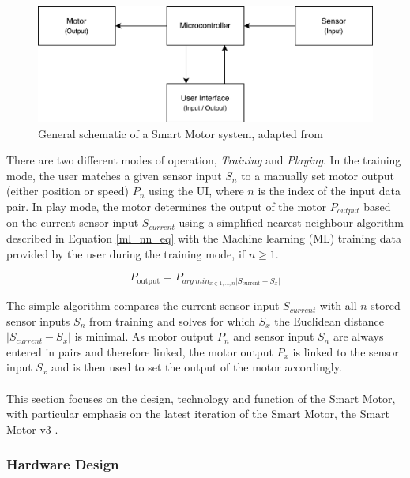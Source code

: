 \begin{figure}[H]
    \centering
    \includegraphics[width=0.75\linewidth]{overleaf/images/sm_concept.png}
    \vspace{\ftspace}
    \caption{General schematic of a Smart Motor system, adapted from \citet[p. 19]{dahal_designing_2024}}
    \label{fig:sm_schematic}
\end{figure}

There are two different modes of operation, \textit{Training} and \textit{Playing}. In the training mode, the user matches a given sensor input $S_n$ to a manually set motor output (either position or speed) $P_n$ using the UI, where $n$ is the index of the input data pair.
In play mode, the motor determines the output of the motor $P_{output}$ based on the current sensor input $S_{current}$ using a simplified nearest-neighbour algorithm described in Equation \ref{ml_nn_eq} with the Machine learning (ML) training data provided by the user during the training mode, if $n \geq 1$.

\begin{equation}\label{ml_nn_eq}
    P_{\text{output}} = P_{arg\ min_{x \in {1,\ldots,n}} |S_{\text{current}} - S_x|}
\end{equation}

The simple algorithm compares the current sensor input $S_{current}$ with all $n$ stored sensor inputs $S_n$ from training and solves for which $S_x$ the Euclidean distance $|S_{current}-S_x|$ is minimal. As motor output $P_n$ and sensor input $S_n$ are always entered in pairs and therefore linked, the motor output $P_x$ is linked to the sensor input $S_x$ and is then used to set the output of the motor accordingly.
\\\\
This section focuses on the design, technology and function of the Smart Motor, with particular emphasis on the latest iteration of the Smart Motor, the Smart Motor v3 \citep[p. 38]{dahal_designing_2024}.

\subsubsection{\label{sec:methods_sm_mech}Hardware Design}

